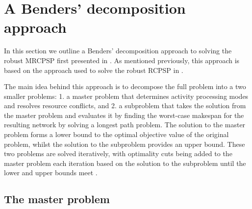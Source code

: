 \documentclass[a4paper,abstracton]{scrartcl}
\begin{document}
\section{A Benders' decomposition approach}

In this section we outline a Benders' decomposition approach to solving the robust MRCPSP first presented in \cite{balouka2021robust}. As mentioned previously, this approach is based on the approach used to solve the robust RCPSP in \cite{bruni2017adjustable}.

The main idea behind this approach is to decompose the full problem into a two smaller problems: 1. a master problem that determines activity processing modes and resolves resource conflicts, and 2. a subproblem that takes the solution from the master problem and evaluates it by finding the worst-case makespan for the resulting network by solving a longest path problem. The solution to the master problem forms a lower bound to the optimal objective value of the original problem, whilst the solution to the subproblem provides an upper bound. These two problems are solved iteratively, with optimality cuts being added to the master problem each iteration based on the solution to the subproblem until the lower and upper bounds meet .

\subsection{The master problem}
\end{document}
